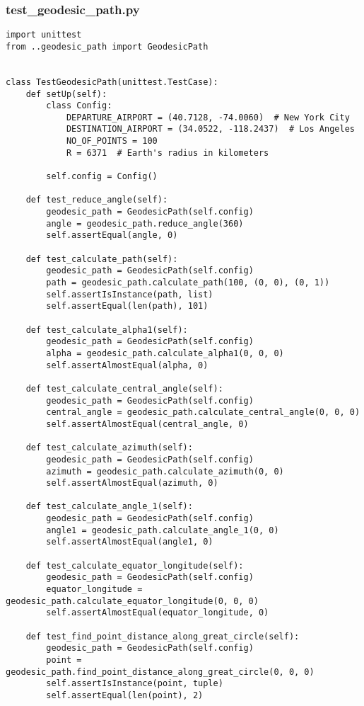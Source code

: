 \subsubsection{test_geodesic_path.py}
\begin{verbatim}
import unittest
from ..geodesic_path import GeodesicPath


class TestGeodesicPath(unittest.TestCase):
    def setUp(self):
        class Config:
            DEPARTURE_AIRPORT = (40.7128, -74.0060)  # New York City
            DESTINATION_AIRPORT = (34.0522, -118.2437)  # Los Angeles
            NO_OF_POINTS = 100
            R = 6371  # Earth's radius in kilometers

        self.config = Config()

    def test_reduce_angle(self):
        geodesic_path = GeodesicPath(self.config)
        angle = geodesic_path.reduce_angle(360)
        self.assertEqual(angle, 0)

    def test_calculate_path(self):
        geodesic_path = GeodesicPath(self.config)
        path = geodesic_path.calculate_path(100, (0, 0), (0, 1))
        self.assertIsInstance(path, list)
        self.assertEqual(len(path), 101)

    def test_calculate_alpha1(self):
        geodesic_path = GeodesicPath(self.config)
        alpha = geodesic_path.calculate_alpha1(0, 0, 0)
        self.assertAlmostEqual(alpha, 0)

    def test_calculate_central_angle(self):
        geodesic_path = GeodesicPath(self.config)
        central_angle = geodesic_path.calculate_central_angle(0, 0, 0)
        self.assertAlmostEqual(central_angle, 0)

    def test_calculate_azimuth(self):
        geodesic_path = GeodesicPath(self.config)
        azimuth = geodesic_path.calculate_azimuth(0, 0)
        self.assertAlmostEqual(azimuth, 0)

    def test_calculate_angle_1(self):
        geodesic_path = GeodesicPath(self.config)
        angle1 = geodesic_path.calculate_angle_1(0, 0)
        self.assertAlmostEqual(angle1, 0)

    def test_calculate_equator_longitude(self):
        geodesic_path = GeodesicPath(self.config)
        equator_longitude = geodesic_path.calculate_equator_longitude(0, 0, 0)
        self.assertAlmostEqual(equator_longitude, 0)

    def test_find_point_distance_along_great_circle(self):
        geodesic_path = GeodesicPath(self.config)
        point = geodesic_path.find_point_distance_along_great_circle(0, 0, 0)
        self.assertIsInstance(point, tuple)
        self.assertEqual(len(point), 2)

\end{verbatim}
